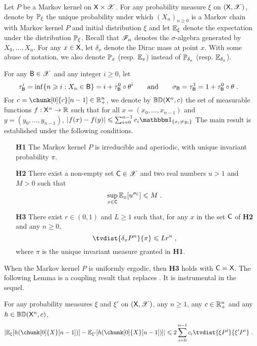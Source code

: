 \documentclass[leqno,11pt,a4paper]{article}
\begin{document}
Let $P$ be a Markov kernel on $\mathsf{X} \times \mathscr{X}$.
For any probability measure $\xi$ on $(\mathsf{X},\mathscr{X})$, denote by $\mathbb{P}_{\xi}$  the unique probability under which $(X_n)_{n\geqslant 0}$ is a Markov chain with Markov kernel $P$ and initial distribution $\xi$ and let $\mathbb{E}_{\xi}$ denote the expectation under the distribution $\mathbb{P}_{\xi}$.
Recall that $\mathscr{F}_n$ denotes the $\sigma$-algebra generated by $X_0, \ldots,X_n$.
For any $x\in \mathsf{X}$, let $\delta_x$ denote the Dirac mass at point $x$.
With some abuse of notation, we also denote $\mathbb{P}_x$ (resp. $\mathbb{E}_x$) instead of $\mathbb{P}_{\delta_x}$ (resp. $\mathbb{E}_{\delta_x}$).

For any $\mathsf{B}\in \mathscr{X}$ and any integer $i\geqslant 0$, let
\[
\tau_{\mathsf{B}}^i=\inf\{n\geqslant i: X_n\in \mathsf{B}\}=i+\tau_{\mathsf{B}}^0\circ \theta^i
\qquad \text{and} \qquad
\sigma_{\mathsf{B}}=\tau_{\mathsf{B}}^1=1+\tau_{\mathsf{B}}^0\circ \theta\;.
\]
For $c = \chunk[0]{c}[n-1] \in \R_+^n$, we denote by  $\mathbb{BD}(\mathsf{X}^n,c)$  the set of measurable functions $f:\mathsf{X}^n\to\mathbb{R}$ such that for all $x= (x_0,\dots,x_{n-1})$ and $y= (y_0,\dots,y_{n-1})$, $|f(x)-f(y)|\leqslant \sum_{i=0}^{n-1} c_i\indiacc{x_i\ne y_i}$
The main result is established under the following conditions.
\begin{itemize}
\item[{\bf H1}] The Markov kernel $P$ is irreducible and aperiodic, with unique invariant probability $\pi$.
\item[{\bf H2}] There exist a non-empty set $\mathsf{C} \in \mathscr{X}$ and two real numbers $u>1$ and $M>0$ such that
  \[\sup_{x\in \mathsf{C}}\mathbb{E}_x[u^{\sigma_{\mathsf{C}}}]\leqslant M\;.\]
\item[{\bf H3}] There exist $r\in (0,1)$ and $L\geqslant 1$ such that, for any $x$ in the set $\mathsf{C}$ of {\bf H2} and any $n\geqslant 0$,
\[
\tvdist{\delta_xP^n}{\pi} \leqslant Lr^n\eqsp,
\]
where $\pi$ is the unique invariant measure granted in {\bf H1}.
\end{itemize}
When the Markov kernel $P$ is uniformly ergodic, then {\bf H3} holds with $\mathsf{C}=\mathsf{X}$. The following Lemma is a coupling result that replaces \cite[Lemma~6]{MR3407208}.
It is instrumental in the sequel.
\begin{lemma}\label{lem:DMPS18}
 For any probability measures $\xi$ and $\xi'$ on $(\mathsf{X},\mathscr{X})$, any $n\geqslant 1$, any $c\in \mathbb{R}_+^n$ and any $h\in \mathbb{B}\mathbb{D}(\mathsf{X}^n,c)$,
\begin{equation*}\label{eq:Step1}
 |\Ebb_\xi[h(\chunk[0]{X}[n-1])]-\Ebb_{\xi'}[h(\chunk[0]{X}[n-1])]|\leqslant 2\sum_{i=0}^{n-1}c_i \tvdist{\xi P^i}{\xi'P^i}\eqsp.
\end{equation*}
\end{lemma}
\end{document}
